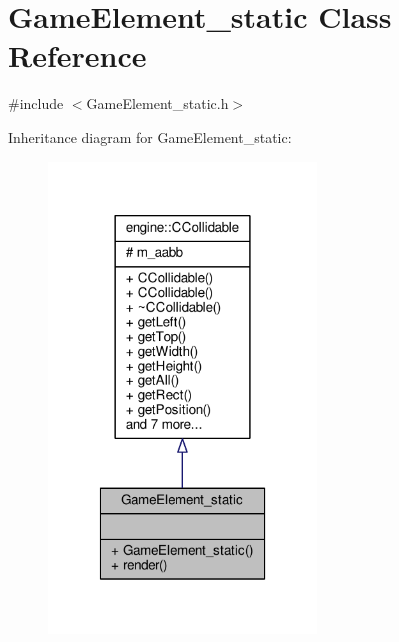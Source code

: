 \hypertarget{classGameElement__static}{\section{Game\-Element\-\_\-static Class Reference}
\label{classGameElement__static}
}


{\ttfamily \#include $<$Game\-Element\-\_\-static.\-h$>$}



Inheritance diagram for Game\-Element\-\_\-static\-:\nopagebreak
\begin{figure}[H]
\begin{center}
\leavevmode
\includegraphics[width=202pt]{classGameElement__static__inherit__graph}
\end{center}
\end{figure}


